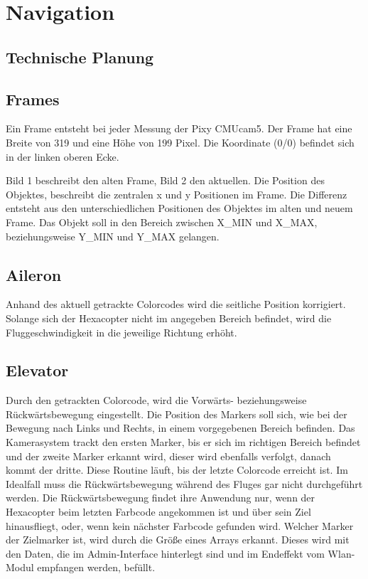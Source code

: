 \section{Navigation}

  \subsection{Technische Planung}

    \subsection*{Frames}
    Ein Frame entsteht bei jeder Messung der Pixy CMUcam5. Der Frame hat eine Breite von 319 und eine Höhe von 199 Pixel. Die Koordinate (0/0) befindet sich in der linken oberen Ecke.

    Bild 1 beschreibt den alten Frame, Bild 2 den aktuellen. Die Position des Objektes, beschreibt die zentralen x und y Positionen im Frame. Die Differenz entsteht aus den unterschiedlichen Positionen des Objektes im alten und neuem Frame. Das Objekt soll in den Bereich zwischen X\_MIN und X\_MAX, beziehungsweise Y\_MIN und Y\_MAX gelangen.


    \subsection*{Aileron}
    Anhand des aktuell getrackte Colorcodes wird die seitliche Position korrigiert. Solange sich der Hexacopter nicht im angegeben Bereich befindet, wird die Fluggeschwindigkeit in die jeweilige Richtung erhöht.

    \subsection*{Elevator}
    Durch den getrackten Colorcode, wird die Vorwärts- beziehungsweise Rückwärtsbewegung eingestellt. Die Position des Markers soll sich, wie bei der Bewegung nach Links und Rechts, in einem vorgegebenen Bereich befinden. 
    Das Kamerasystem trackt den ersten Marker, bis er sich im richtigen Bereich befindet und der zweite Marker erkannt wird, dieser wird ebenfalls verfolgt, danach kommt der dritte. Diese Routine läuft, bis der letzte Colorcode erreicht ist. Im Idealfall muss die Rückwärtsbewegung während des Fluges gar nicht durchgeführt werden. Die Rückwärtsbewegung findet ihre Anwendung nur, wenn der Hexacopter beim letzten Farbcode angekommen ist und über sein Ziel hinausfliegt, oder, wenn kein nächster Farbcode gefunden wird. Welcher Marker der Zielmarker ist, wird durch die Größe eines Arrays erkannt. Dieses wird mit den Daten, die im Admin-Interface hinterlegt sind und im Endeffekt vom Wlan-Modul empfangen werden, befüllt.

